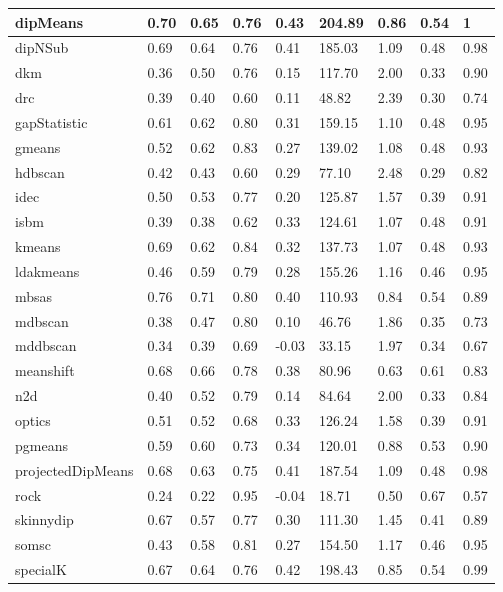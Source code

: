 \begin{table}[H]
\begin{tabular}{|l|l|l|l|l|l|l|l|l|}
\hline
dipMeans & 0.70 & 0.65 & 0.76 & 0.43 & 204.89 & 0.86 & 0.54 & 1 \\
\hline
dipNSub & 0.69 & 0.64 & 0.76 & 0.41 & 185.03 & 1.09 & 0.48 & 0.98 \\
\hline
dkm & 0.36 & 0.50 & 0.76 & 0.15 & 117.70 & 2.00 & 0.33 & 0.90 \\
\hline
drc & 0.39 & 0.40 & 0.60 & 0.11 & 48.82 & 2.39 & 0.30 & 0.74 \\
\hline
gapStatistic & 0.61 & 0.62 & 0.80 & 0.31 & 159.15 & 1.10 & 0.48 & 0.95 \\
\hline
gmeans & 0.52 & 0.62 & 0.83 & 0.27 & 139.02 & 1.08 & 0.48 & 0.93 \\
\hline
hdbscan & 0.42 & 0.43 & 0.60 & 0.29 & 77.10 & 2.48 & 0.29 & 0.82 \\
\hline
idec & 0.50 & 0.53 & 0.77 & 0.20 & 125.87 & 1.57 & 0.39 & 0.91 \\
\hline
isbm & 0.39 & 0.38 & 0.62 & 0.33 & 124.61 & 1.07 & 0.48 & 0.91 \\
\hline
kmeans & 0.69 & 0.62 & 0.84 & 0.32 & 137.73 & 1.07 & 0.48 & 0.93 \\
\hline
ldakmeans & 0.46 & 0.59 & 0.79 & 0.28 & 155.26 & 1.16 & 0.46 & 0.95 \\
\hline
mbsas & 0.76 & 0.71 & 0.80 & 0.40 & 110.93 & 0.84 & 0.54 & 0.89 \\
\hline
mdbscan & 0.38 & 0.47 & 0.80 & 0.10 & 46.76 & 1.86 & 0.35 & 0.73 \\
\hline
mddbscan & 0.34 & 0.39 & 0.69 & -0.03 & 33.15 & 1.97 & 0.34 & 0.67 \\
\hline
meanshift & 0.68 & 0.66 & 0.78 & 0.38 & 80.96 & 0.63 & 0.61 & 0.83 \\
\hline
n2d & 0.40 & 0.52 & 0.79 & 0.14 & 84.64 & 2.00 & 0.33 & 0.84 \\
\hline
optics & 0.51 & 0.52 & 0.68 & 0.33 & 126.24 & 1.58 & 0.39 & 0.91 \\
\hline
pgmeans & 0.59 & 0.60 & 0.73 & 0.34 & 120.01 & 0.88 & 0.53 & 0.90 \\
\hline
projectedDipMeans & 0.68 & 0.63 & 0.75 & 0.41 & 187.54 & 1.09 & 0.48 & 0.98 \\
\hline
rock & 0.24 & 0.22 & 0.95 & -0.04 & 18.71 & 0.50 & 0.67 & 0.57 \\
\hline
skinnydip & 0.67 & 0.57 & 0.77 & 0.30 & 111.30 & 1.45 & 0.41 & 0.89 \\
\hline
somsc & 0.43 & 0.58 & 0.81 & 0.27 & 154.50 & 1.17 & 0.46 & 0.95 \\
\hline
specialK & 0.67 & 0.64 & 0.76 & 0.42 & 198.43 & 0.85 & 0.54 & 0.99 \\

\end{tabular}
\end{table}
